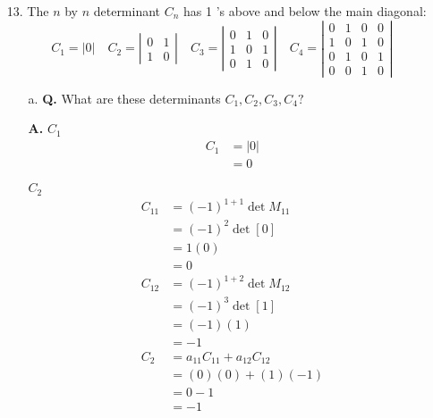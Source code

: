 \documentclass[main.tex]{subfiles}
\begin{document}
\begin{enumerate}
    \item [13.] The $n$ by $n$ determinant $C_{n}$ has 1 's above and below the main diagonal:
    $$
    C_{1}=|0| \quad C_{2}=\left|\begin{array}{ll}
    0 & 1 \\
    1 & 0
    \end{array}\right| \quad C_{3}=\left|\begin{array}{lll}
    0 & 1 & 0 \\
    1 & 0 & 1 \\
    0 & 1 & 0
    \end{array}\right| \quad C_{4}=\left|\begin{array}{llll}
    0 & 1 & 0 & 0 \\
    1 & 0 & 1 & 0 \\
    0 & 1 & 0 & 1 \\
    0 & 0 & 1 & 0
    \end{array}\right|
    $$
    \begin{enumerate}
        \item [a.] \textbf{Q.} What are these determinants $C_{1}, C_{2}, C_{3}, C_{4} ?$ 
        
        \textbf{A.}
        $C_{1}$
        $$
        \begin{aligned}
        C_{1} &=|0| \\
        &=0
        \end{aligned}
        $$
        
        $C_{2}$
        $$
        \begin{aligned}
        C_{11} &=(-1)^{1+1} \operatorname{det} M_{11} \\
        &=(-1)^{2} \operatorname{det}[0] \\
        &=1(0) \\
        &=0 \\
        C_{12} &=(-1)^{1+2} \operatorname{det} M_{12} \\
        &=(-1)^{3} \operatorname{det}[1] \\
        &=(-1)(1) \\
        &=-1 \\
        C_{2}&=a_{11} C_{11}+a_{12} C_{12} \\
        &=(0)(0)+(1)(-1) \\
        &=0-1 \\
        &=-1
        \end{aligned}
        $$
        

\end{enumerate}
\end{enumerate}
\end{document}
